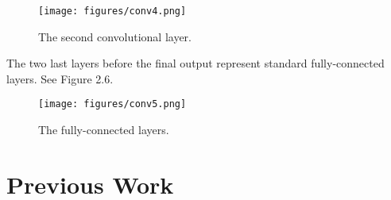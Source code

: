 \begin{figure}[!ht]
  \centering
  \texttt{[image: figures/conv4.png]}  
  \caption[The second convolutional layer.]{The second convolutional layer.}
  \protect\label{fig:conv4}
\end{figure}
\FloatBarrier
The two last layers before the final output represent standard fully-connected layers. See Figure 2.6.

\begin{figure}[!ht]
  \centering
  \texttt{[image: figures/conv5.png]}  
  \caption[The fully-connected layers.]{The fully-connected layers.}
  \protect\label{fig:conv5}
\end{figure}
\FloatBarrier

\section{Previous Work}
